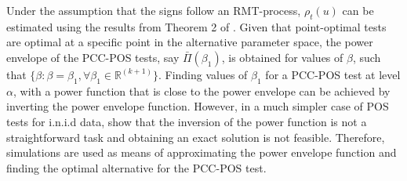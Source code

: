\documentclass[harvard,11pt]{article}
\begin{document}
Under the assumption that the signs follow an RMT-process, $\rho_t(u)$ can be estimated using the results from Theorem 2 of \citet{heinrich1982factorization}.  Given that point-optimal tests are optimal at a specific point in the alternative parameter space, the power envelope of the PCC-POS tests, say $\bar{\Pi}(\beta_1)$, is obtained for values of $\beta$, such that $\{\beta: \beta=\beta_1, \forall \beta_1\in \mathbb{R}^{(k+1)}\}$. Finding values of $\beta_1$ for a PCC-POS test at level $\alpha$, with a power function that is close to the power envelope can be achieved by inverting the power envelope function. However, in a much simpler case of POS tests for i.n.i.d data, \citet{dufour2010exact} show that the inversion of the power function is not a straightforward task and obtaining an exact solution is not feasible. Therefore, simulations are used as means of approximating the power envelope function and finding the optimal alternative for the PCC-POS test.
\end{document}

